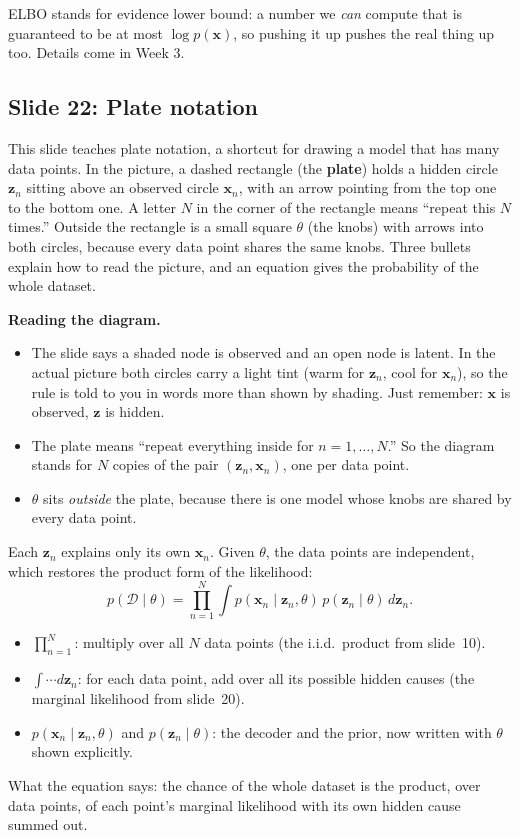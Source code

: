 ELBO stands for evidence lower bound: a number we \textit{can} compute that is guaranteed to be at most $\log p(\mathbf{x})$, so pushing it up pushes the real thing up too. Details come in Week 3.

\subsection*{Slide 22: Plate notation}

This slide teaches plate notation, a shortcut for drawing a model that has many data points. In the picture, a dashed rectangle (the \textbf{plate}) holds a hidden circle $\mathbf{z}_n$ sitting above an observed circle $\mathbf{x}_n$, with an arrow pointing from the top one to the bottom one. A letter $N$ in the corner of the rectangle means ``repeat this $N$ times.'' Outside the rectangle is a small square $\theta$ (the knobs) with arrows into both circles, because every data point shares the same knobs. Three bullets explain how to read the picture, and an equation gives the probability of the whole dataset.

\textbf{Reading the diagram.}
\begin{itemize}
\item The slide says a shaded node is observed and an open node is latent. In the actual picture both circles carry a light tint (warm for $\mathbf{z}_n$, cool for $\mathbf{x}_n$), so the rule is told to you in words more than shown by shading. Just remember: $\mathbf{x}$ is observed, $\mathbf{z}$ is hidden.
\item The plate means ``repeat everything inside for $n=1,\dots,N$.'' So the diagram stands for $N$ copies of the pair $(\mathbf{z}_n,\mathbf{x}_n)$, one per data point.
\item $\theta$ sits \textit{outside} the plate, because there is one model whose knobs are shared by every data point.
\end{itemize}
Each $\mathbf{z}_n$ explains only its own $\mathbf{x}_n$. Given $\theta$, the data points are independent, which restores the product form of the likelihood:
\[
p(\mathcal{D}\mid\theta)=\prod_{n=1}^{N}\int p(\mathbf{x}_n\mid\mathbf{z}_n,\theta)\,p(\mathbf{z}_n\mid\theta)\,d\mathbf{z}_n.
\]
\begin{itemize}
\item $\prod_{n=1}^{N}$: multiply over all $N$ data points (the i.i.d.\ product from slide~10).
\item $\int\cdots d\mathbf{z}_n$: for each data point, add over all its possible hidden causes (the marginal likelihood from slide~20).
\item $p(\mathbf{x}_n\mid\mathbf{z}_n,\theta)$ and $p(\mathbf{z}_n\mid\theta)$: the decoder and the prior, now written with $\theta$ shown explicitly.
\end{itemize}
What the equation says: the chance of the whole dataset is the product, over data points, of each point's marginal likelihood with its own hidden cause summed out.

